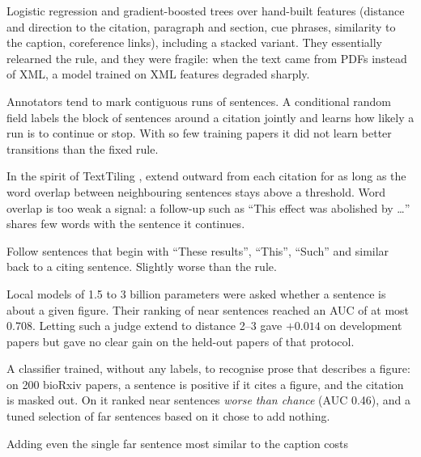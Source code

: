 \begin{description}[leftmargin=1.2em,style=nextline,itemsep=3pt]
  \item[Feature models] Logistic regression and gradient-boosted trees over hand-built features (distance and
        direction to the citation, paragraph and section, cue phrases, similarity to the caption, coreference
        links), including a stacked variant. They essentially relearned the rule, and they were fragile: when
        the text came from PDFs instead of XML, a model trained on XML features degraded sharply.
  \item[Linear-chain CRF] Annotators tend to mark contiguous runs of sentences. A conditional random field
        \citep{lafferty2001crf} labels the block of sentences around a citation jointly and learns how likely a
        run is to continue or stop. With so few training papers it did not learn better transitions than the
        fixed  rule.
  \item[Text tiling] In the spirit of TextTiling \citep{hearst1997texttiling}, extend outward from each
        citation for as long as the word overlap between neighbouring sentences stays above a threshold.
        Word overlap is too weak a signal: a follow-up such as ``This effect was abolished by \ldots'' shares
        few words with the sentence it continues.
  \item[Anaphora continuation] Follow sentences that begin with ``These results'', ``This'', ``Such'' and
        similar back to a citing sentence. Slightly worse than the rule.
  \item[Small language models as judges] Local models of 1.5 to 3 billion parameters were asked whether a
        sentence is about a given figure. Their ranking of near sentences reached an AUC of at most 0.708.
        Letting such a judge extend \bof{} to distance 2--3 gave $+0.014$ on development papers but gave no
        clear gain on the held-out papers of that protocol.
  \item[``Figure-talk'' classifier] A classifier trained, without any \figsum{} labels, to recognise prose that
        describes a figure: on 200 bioRxiv papers, a sentence is positive if it cites a figure, and the
        citation is masked out. On \figsum{} it ranked near sentences \emph{worse than chance} (AUC 0.46), and
        a tuned selection of far sentences based on it chose to add nothing.
  \item[Caption-similar far sentences] Adding even the single far sentence most similar to the caption costs

\end{description}
